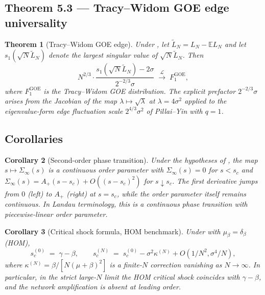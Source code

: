 \documentclass[11pt,a4paper]{article}
\newtheorem{theorem}{Theorem}[section]
\newtheorem{corollary}[theorem]{Corollary}
\theoremstyle{definition}
\newcommand{\SigmaInf}{\Sigma_\infty}
\begin{document}
\subsection{Theorem 5.3 --- Tracy--Widom GOE edge universality}

\begin{theorem}[Tracy--Widom GOE edge]
\label{thm:thm53}
Under , let
$\widetilde L_N = L_N - \mathbb E L_N$ and let $s_1(\sqrt N\widetilde L_N)$
denote the largest singular value of $\sqrt N\widetilde L_N$. Then
\[
N^{2/3}\cdot\frac{s_1(\sqrt N\widetilde L_N) - 2\sigma}{2^{-2/3}\sigma}\;\xrightarrow{\mathcal L}\;F_1^{\mathrm{GOE}},
\]
where $F_1^{\mathrm{GOE}}$ is the Tracy--Widom GOE distribution. The explicit
prefactor $2^{-2/3}\sigma$ arises from the Jacobian of the map
$\lambda\mapsto\sqrt\lambda$ at $\lambda = 4\sigma^2$ applied to the
eigenvalue-form edge fluctuation scale $2^{4/3}\sigma^2$ of Pillai--Yin
\cite[Theorem~1.2]{PillaiYin2014} with $q=1$.
\end{theorem}

\subsection{Corollaries}

\begin{corollary}[Second-order phase transition]
\label{cor:6.1}
Under the hypotheses of , the map $s\mapsto\SigmaInf(s)$ is
a continuous order parameter with $\SigmaInf(s) = 0$ for $s<s_c$ and
$\SigmaInf(s) = A_+(s-s_c)+O((s-s_c)^2)$ for $s\downarrow s_c$. The first
derivative jumps from $0$ (left) to $A_+$ (right) at $s = s_c$, while the
order parameter itself remains continuous. In Landau terminology, this is a
continuous phase transition with piecewise-linear order parameter.
\end{corollary}

\begin{corollary}[Critical shock formula, HOM benchmark]
\label{cor:6.2}
Under  with $\mu_\beta = \delta_\beta$ (HOM),
\[
s_c^{(0)}\;=\;\gamma - \beta,
\qquad
s_c^{(N)}\;=\;s_c^{(0)} - \sigma^2\kappa^{(N)} + O(1/N^2,\sigma^4/N),
\]
where $\kappa^{(N)} = \beta/[N(\mu+\beta)^2]$ is a finite-$N$ correction
vanishing as $N\to\infty$. In particular, in the strict large-$N$ limit the
HOM critical shock coincides with $\gamma - \beta$, and the network
amplification is absent at leading order.
\end{corollary}
\end{document}
